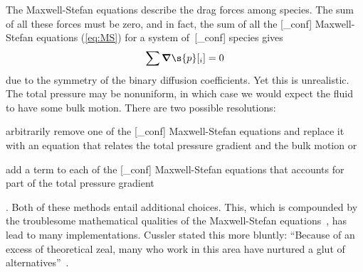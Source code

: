 The Maxwell-Stefan equations describe the drag forces among species.  The sum of all these forces must be zero, and in fact, the sum of all the [_conf] Maxwell-Stefan equations (\ref{eq:MS}) for a system of~[_conf] species gives
\begin{equation}
  \sum\boldsymbol{\nabla}\s{p}[_i] = 0
\end{equation}
due to the symmetry of the binary diffusion coefficients.  Yet this is unrealistic.  The total pressure may be nonuniform, in which case we would expect the fluid to have some bulk motion.  There are two possible resolutions: \begin{inparaenum}[(1)] \item arbitrarily remove one of the [_conf] Maxwell-Stefan equations and replace it with an equation that relates the total pressure gradient and the bulk motion or \item add a term to each of the [_conf] Maxwell-Stefan equations that accounts for part of the total pressure gradient\end{inparaenum}.  Both of these methods entail additional choices.  This, which is compounded by the troublesome mathematical qualities of the Maxwell-Stefan equations~\cite{Cussler1997, Kulikovsky1999, Weber2005}, has lead to many implementations.  Cussler stated this more bluntly:  ``Because of an excess of theoretical zeal, many who work in this area have nurtured a glut of alternatives''~\cite{Cussler1997}. %

